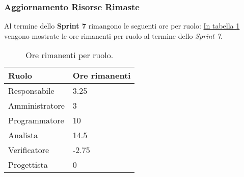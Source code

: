 \subsubsection{Aggiornamento Risorse Rimaste}
\label{sec:AggiornamentoRisorse_Sprint7}
Al termine dello \textbf{Sprint 7} rimangono le seguenti ore per ruolo: \hyperref[tab:sprint7_ore_rimanenti]{In tabella \ref{tab:sprint7_ore_rimanenti}} vengono mostrate le ore rimanenti per ruolo al termine dello \textit{Sprint 7}.

\begin{table}[H]
    \centering
    \begin{tabular}{| l | l |}
    \hline
    \textbf{Ruolo} & 
    \textbf{Ore rimanenti}\\
    \hline
        Responsabile & 3.25\\
    \hline
        Amministratore & 3\\
    \hline
        Programmatore & 10\\
    \hline
        Analista & 14.5\\
    \hline
        Verificatore & -2.75\\
    \hline
        Progettista & 0\\
    \hline
    \end{tabular}
    \caption{Ore rimanenti per ruolo.}
    \label{tab:sprint7_ore_rimanenti} 
\end{table}